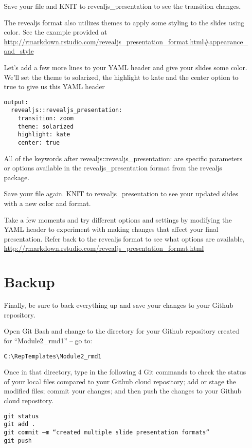 \documentclass[]{book}
\theoremstyle{definition}
\theoremstyle{definition}
\theoremstyle{definition}
\theoremstyle{remark}
\begin{document}
Save your file and KNIT to revealjs\_presentation to see the transition
changes.

The revealjs format also utilizes themes to apply some styling to the
slides using color. See the example provided at
\url{http://rmarkdown.rstudio.com/revealjs_presentation_format.html\#appearance_and_style}

Let's add a few more lines to your YAML header and give your slides some
color. We'll set the theme to solarized, the highlight to kate and the
center option to true to give us this YAML header

\begin{verbatim}
output: 
  revealjs::revealjs_presentation:
    transition: zoom
    theme: solarized
    highlight: kate
    center: true
\end{verbatim}

All of the keywords after revealjs::revealjs\_presentation: are specific
parameters or options available in the revealjs\_presentation format
from the revealjs package.

Save your file again. KNIT to revealjs\_presentation to see your updated
slides with a new color and format.

Take a few moments and try different options and settings by modifying
the YAML header to experiment with making changes that affect your final
presentation. Refer back to the revealjs format to see what options are
available,
\url{http://rmarkdown.rstudio.com/revealjs_presentation_format.html}

\section{Backup}\label{backup}

Finally, be sure to back everything up and save your changes to your
Github repository.

Open Git Bash and change to the directory for your Github repository
created for ``Module2\_rmd1'' -- go to:

\texttt{C:\textbackslash{}RepTemplates\textbackslash{}Module2\_rmd1}

Once in that directory, type in the following 4 Git commands to check
the status of your local files compared to your Github cloud repository;
add or stage the modified files; commit your changes; and then push the
changes to your Github cloud repository.

\begin{verbatim}
git status
git add .
git commit –m “created multiple slide presentation formats”
git push
\end{verbatim}
\end{document}

